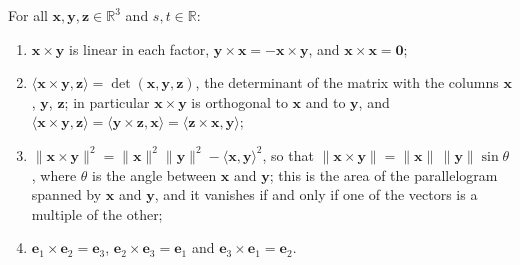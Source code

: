 \begin{proposition}
\label{prop:cross-product}
For all $\mathbf x,\mathbf y,\mathbf z\in\mathbb R^3$ and $s,t\in\mathbb R$:
\begin{enumerate}
\item $\mathbf x\times\mathbf y$ is linear in each factor, $\mathbf y\times\mathbf x=-\mathbf x\times\mathbf y$, and $\mathbf x\times\mathbf x=\mathbf0$;
\item $\langle\mathbf x\times\mathbf y,\mathbf z\rangle=\det(\mathbf x,\mathbf y,\mathbf z)$, the determinant of the matrix with the columns $\mathbf x$, $\mathbf y$, $\mathbf z$; in particular $\mathbf x\times\mathbf y$ is orthogonal to $\mathbf x$ and to $\mathbf y$, and $\langle\mathbf x\times\mathbf y,\mathbf z\rangle=\langle\mathbf y\times\mathbf z,\mathbf x\rangle=\langle\mathbf z\times\mathbf x,\mathbf y\rangle$;
\item $\|\mathbf x\times\mathbf y\|^2=\|\mathbf x\|^2\|\mathbf y\|^2-\langle\mathbf x,\mathbf y\rangle^2$, so that $\|\mathbf x\times\mathbf y\|=\|\mathbf x\|\,\|\mathbf y\|\sin\theta$, where $\theta$ is the angle between $\mathbf x$ and $\mathbf y$; this is the area of the parallelogram spanned by $\mathbf x$ and $\mathbf y$, and it vanishes if and only if one of the vectors is a multiple of the other;
\item $\mathbf e_1\times\mathbf e_2=\mathbf e_3$, $\mathbf e_2\times\mathbf e_3=\mathbf e_1$ and $\mathbf e_3\times\mathbf e_1=\mathbf e_2$.
\end{enumerate}
\end{proposition}

